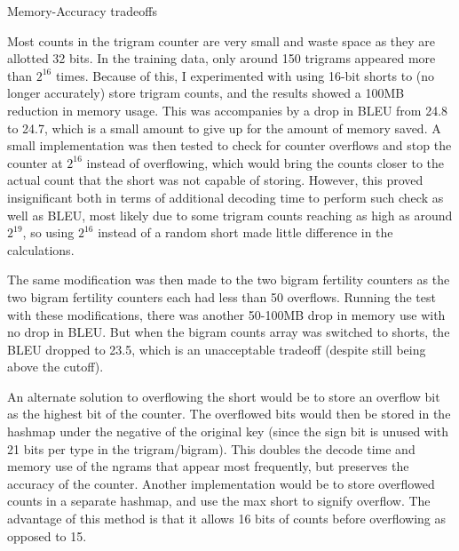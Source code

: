 

Memory-Accuracy tradeoffs

Most counts in the trigram counter are very small and waste space as they are allotted 32 bits. In the training data, only around 150 trigrams appeared more than $2^16$ times. Because of this, I experimented with using 16-bit shorts to (no longer accurately) store trigram counts, and the results showed a 100MB reduction in memory usage. This was accompanies by a drop in BLEU from 24.8 to 24.7, which is a small amount to give up for the amount of memory saved. A small implementation was then tested to check for counter overflows and stop the counter at $2^16$ instead of overflowing, which would bring the counts closer to the actual count that the short was not capable of storing. However, this proved insignificant both in terms of additional decoding time to perform such check as well as BLEU, most likely due to some trigram counts reaching as high as around $2^19$, so using $2^16$ instead of a random short made little difference in the calculations.

The same modification was then made to the two bigram fertility counters as the two bigram fertility counters each had less than 50 overflows. Running the test with these modifications, there was another 50-100MB drop in memory use with no drop in BLEU. But when the bigram counts array was switched to shorts, the BLEU dropped to 23.5, which is an unacceptable tradeoff (despite still being above the cutoff).

An alternate solution to overflowing the short would be to store an overflow bit as the highest bit of the counter. The overflowed bits would then be stored in the hashmap under the negative of the original key (since the sign bit is unused with 21 bits per type in the trigram/bigram). This doubles the decode time and memory use of the ngrams that appear most frequently, but preserves the accuracy of the counter. Another implementation would be to store overflowed counts in a separate hashmap, and use the max short to signify overflow. The advantage of this method is that it allows 16 bits of counts before overflowing as opposed to 15.

